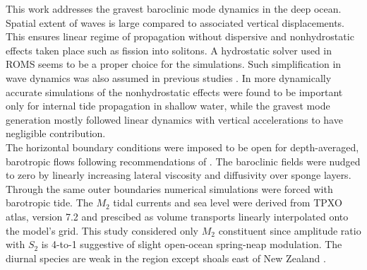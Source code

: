 \documentclass[12pt]{article}
\begin{document}
This work addresses the gravest baroclinic mode dynamics in the deep ocean. Spatial 
extent of 
waves is large compared to associated vertical displacements. This ensures linear regime of 
propagation without dispersive and nonhydrostatic effects taken place such as fission into 
solitons. A hydrostatic solver used in ROMS seems to be a proper choice for the simulations. Such 
simplification in wave dynamics was also assumed in previous studies \citep{carter2008energetics, 
merrifield2001generation,  merrifield2002model, kerry2013effects}. In more dynamically 
accurate   
simulations of \citep{kang2012energetics, zhang2011three} the nonhydrostatic effects were found to 
be important only for internal tide propagation in shallow water, while the gravest mode generation 
mostly followed linear dynamics with vertical accelerations to have negligible contribution.\\

The horizontal boundary conditions were imposed to be open for depth-averaged, barotropic flows 
following recommendations of \cite{marchesiello2001open}. The baroclinic fields were  
nudged to zero by linearly increasing lateral viscosity and diffusivity over sponge layers. Through 
the same outer boundaries numerical simulations were forced with barotropic tide. The $M_2$ tidal 
currents and sea level were derived from TPXO atlas, version 7.2 \citep{egbert2002efficient} and 
prescibed as volume transports linearly interpolated onto the model's grid. This study considered 
only $M_2$ constituent since amplitude ratio with $S_2$ is 4-to-1 suggestive of 
slight open-ocean 
spring-neap modulation. The diurnal species are weak in the region except shoals east of New 
Zealand \citep{walters2001ocean}.\\
\end{document}
